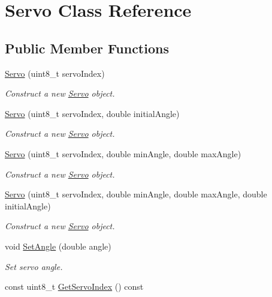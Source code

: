\hypertarget{classServo}{}\section{Servo Class Reference}
\label{classServo}
\subsection*{Public Member Functions}
\begin{DoxyCompactItemize}
\item 
\mbox{\hyperlink{classServo_a3923a1b16b5a158d57307f364de4627e}{Servo}} (uint8\+\_\+t servo\+Index)
\begin{DoxyCompactList}\small\item\em Construct a new \mbox{\hyperlink{classServo}{Servo}} object. \end{DoxyCompactList}\item 
\mbox{\hyperlink{classServo_aec2c479518249cd444854c5dbb94b38f}{Servo}} (uint8\+\_\+t servo\+Index, double initial\+Angle)
\begin{DoxyCompactList}\small\item\em Construct a new \mbox{\hyperlink{classServo}{Servo}} object. \end{DoxyCompactList}\item 
\mbox{\hyperlink{classServo_a0bac7b17dbff704a36c75dd476c133f8}{Servo}} (uint8\+\_\+t servo\+Index, double min\+Angle, double max\+Angle)
\begin{DoxyCompactList}\small\item\em Construct a new \mbox{\hyperlink{classServo}{Servo}} object. \end{DoxyCompactList}\item 
\mbox{\hyperlink{classServo_a1fc3caed6ab6b598f3322225e6215030}{Servo}} (uint8\+\_\+t servo\+Index, double min\+Angle, double max\+Angle, double initial\+Angle)
\begin{DoxyCompactList}\small\item\em Construct a new \mbox{\hyperlink{classServo}{Servo}} object. \end{DoxyCompactList}\item 
void \mbox{\hyperlink{classServo_af14dee8f2d30567768b12485b43111f2}{Set\+Angle}} (double angle)
\begin{DoxyCompactList}\small\item\em Set servo angle. \end{DoxyCompactList}\item 
const uint8\+\_\+t \mbox{\hyperlink{classServo_a1daacfe18f997f3d3dc1ea4d5d293e70}{Get\+Servo\+Index}} () const

\end{DoxyCompactItemize}
